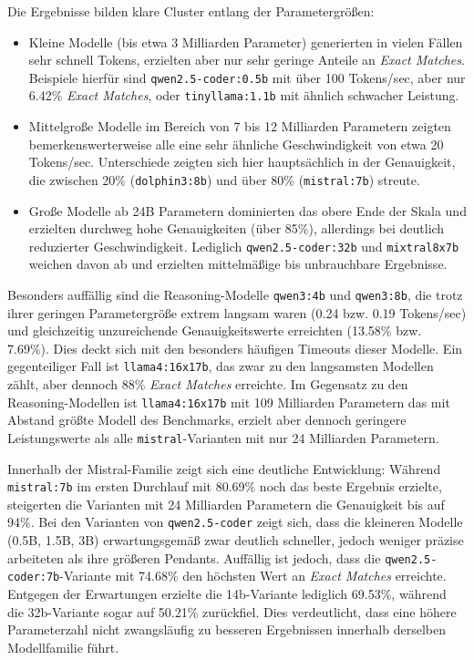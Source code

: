 Die Ergebnisse bilden klare Cluster entlang der Parametergrößen:
\begin{itemize}
    \item Kleine Modelle (bis etwa 3 Milliarden Parameter) generierten in vielen Fällen sehr schnell Tokens, erzielten aber nur sehr geringe Anteile an \textit{Exact Matches}. Beispiele hierfür sind \texttt{qwen2.5-coder:0.5b} mit über \num{100} Tokens/sec, aber nur \num{6.42}\% \textit{Exact Matches}, oder \texttt{tinyllama:1.1b} mit ähnlich schwacher Leistung.
    \item Mittelgroße Modelle im Bereich von 7 bis 12 Milliarden Parametern zeigten bemerkenswerterweise alle eine sehr ähnliche Geschwindigkeit von etwa \num{20} Tokens/sec. Unterschiede zeigten sich hier hauptsächlich in der Genauigkeit, die zwischen \num{20}\% (\texttt{dolphin3:8b}) und über \num{80}\% (\texttt{mistral:7b}) streute.
    \item Große Modelle ab 24B Parametern dominierten das obere Ende der Skala und erzielten durchweg hohe Genauigkeiten (über \num{85}\%), allerdings bei deutlich reduzierter Geschwindigkeit. Lediglich \texttt{qwen2.5-coder:32b} und \texttt{mixtral8x7b} weichen davon ab und erzielten mittelmäßige bis unbrauchbare Ergebnisse.
\end{itemize}

Besonders auffällig sind die Reasoning-Modelle \texttt{qwen3:4b} und \texttt{qwen3:8b}, die trotz ihrer geringen Parametergröße extrem langsam waren (\num{0.24} bzw. \num{0.19} Tokens/sec) und gleichzeitig unzureichende Genauigkeitswerte erreichten (\num{13.58}\% bzw. \num{7.69}\%). Dies deckt sich mit den besonders häufigen Timeouts dieser Modelle.
Ein gegenteiliger Fall ist \texttt{llama4:16x17b}, das zwar zu den langsamsten Modellen zählt, aber dennoch \num{88}\% \textit{Exact Matches} erreichte.
Im Gegensatz zu den Reasoning-Modellen ist \texttt{llama4:16x17b} mit 109 Milliarden Parametern das mit Abstand größte Modell des Benchmarks, erzielt aber dennoch geringere Leistungswerte als alle \texttt{mistral}-Varianten mit nur 24 Milliarden Parametern.

Innerhalb der Mistral-Familie zeigt sich eine deutliche Entwicklung: Während \texttt{mistral:7b} im ersten Durchlauf mit \num{80.69}\% noch das beste Ergebnis erzielte, steigerten die Varianten mit 24 Milliarden Parametern die Genauigkeit bis auf \num{94}\%.
Bei den Varianten von \texttt{qwen2.5-coder} zeigt sich, dass die kleineren Modelle (0.5B, 1.5B, 3B) erwartungsgemäß zwar deutlich schneller, jedoch weniger präzise arbeiteten als ihre größeren Pendants.
Auffällig ist jedoch, dass die \texttt{qwen2.5-coder:7b}-Variante mit \num{74,68}\% den höchsten Wert an \textit{Exact Matches} erreichte.
Entgegen der Erwartungen erzielte die 14b-Variante lediglich \num{69,53}\%, während die 32b-Variante sogar auf \num{50,21}\% zurückfiel.
Dies verdeutlicht, dass eine höhere Parameterzahl nicht zwangsläufig zu besseren Ergebnissen innerhalb derselben Modellfamilie führt.

